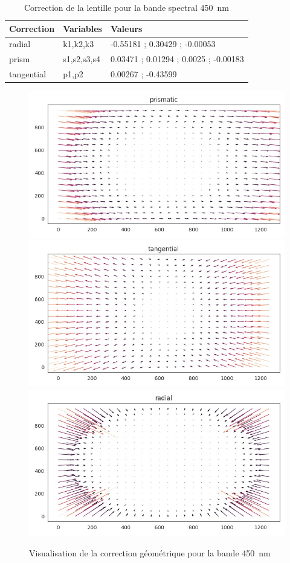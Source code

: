 \documentclass[../thesis.tex]{subfiles}
\begin{document}
    \vfill
    \begin{table}[H]
        \centering
        \begin{tabular}{|l|l|l|}
            \hline
            \textbf{Correction} & \textbf{Variables} & \textbf{Valeurs} \\
            \hline
            radial 		& k1,k2,k3 		& -0.55181 ;  0.30429 ; -0.00053 \\
            prism  		& s1,s2,s3,s4	&  0.03471 ;  0.01294 ;  0.0025 ; -0.00183 \\
            tangential 	& p1,p2 		&  0.00267 ; -0.43599 \\
            \hline
        \end{tabular}
        \caption{Correction de la lentille pour la bande spectral \SI{450}{nm}}
        \label{tab:04-geom-450}
    \end{table}
    \vfill
    \begin{figure}[H]
        \centering
        \includegraphics[width=0.6\linewidth]{img/preprocessing/lens-correction-prismatic}
        \includegraphics[width=0.6\linewidth]{img/preprocessing/lens-correction-tangential}
        \includegraphics[width=0.6\linewidth]{img/preprocessing/lens-correction-radial}
        \caption{Visualisation de la correction géométrique pour la bande \SI{450}{nm}}
        \label{fig:04-geom-450-lens-correction}
    \end{figure}
    \vfill
    
\end{document}
